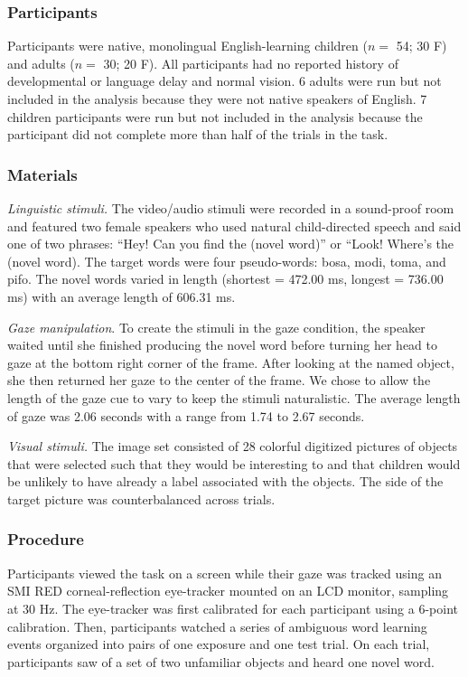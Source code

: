 \documentclass[man,floatsintext]{apa6}
\begin{document}
\subsubsection{Participants}\label{participants-2}

Participants were native, monolingual English-learning children (\(n=\)
54; 30 F) and adults (\(n=\) 30; 20 F). All participants had no reported
history of developmental or language delay and normal vision. 6 adults
were run but not included in the analysis because they were not native
speakers of English. 7 children participants were run but not included
in the analysis because the participant did not complete more than half
of the trials in the task.

\subsubsection{Materials}\label{materials-2}

\emph{Linguistic stimuli.} The video/audio stimuli were recorded in a
sound-proof room and featured two female speakers who used natural
child-directed speech and said one of two phrases: \enquote{Hey! Can you
find the (novel word)} or ``Look! Where's the (novel word). The target
words were four pseudo-words: bosa, modi, toma, and pifo. The novel
words varied in length (shortest = 472.00 ms, longest = 736.00 ms) with
an average length of 606.31 ms.

\emph{Gaze manipulation}. To create the stimuli in the gaze condition,
the speaker waited until she finished producing the novel word before
turning her head to gaze at the bottom right corner of the frame. After
looking at the named object, she then returned her gaze to the center of
the frame. We chose to allow the length of the gaze cue to vary to keep
the stimuli naturalistic. The average length of gaze was 2.06 seconds
with a range from 1.74 to 2.67 seconds.

\emph{Visual stimuli.} The image set consisted of 28 colorful digitized
pictures of objects that were selected such that they would be
interesting to and that children would be unlikely to have already a
label associated with the objects. The side of the target picture was
counterbalanced across trials.

\subsubsection{Procedure}\label{procedure-2}

Participants viewed the task on a screen while their gaze was tracked
using an SMI RED corneal-reflection eye-tracker mounted on an LCD
monitor, sampling at 30 Hz. The eye-tracker was first calibrated for
each participant using a 6-point calibration. Then, participants watched
a series of ambiguous word learning events organized into pairs of one
exposure and one test trial. On each trial, participants saw of a set of
two unfamiliar objects and heard one novel word.
\end{document}
